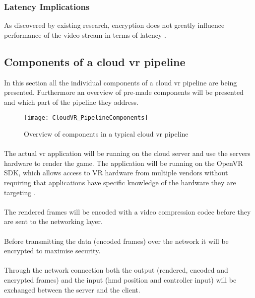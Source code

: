 \subsubsection{Latency Implications}
As discovered by existing research, encryption does not greatly influence performance of the video stream in terms of latency \parencite{Kaknjo_2019}.

\newpage
\subsection{Components of a cloud \acrshort{vr} pipeline}
In this section all the individual components of a cloud \acrshort{vr} pipeline are being presented. Furthermore an overview of pre-made components will be presented and which part of the pipeline they address.

\begin{figure}[h!]
\caption{Overview of components in a typical cloud \acrshort{vr} pipeline}
\label{fig:pipeline}
\texttt{[image: CloudVR\_PipelineComponents]}
\end{figure}


\paragraph{\textSR}
The actual \acrshort{vr} application will be running on the cloud server and use the servers hardware to render the game. The application will be running on the OpenVR SDK, which allows access to VR hardware from multiple vendors without requiring that applications have specific knowledge of the hardware they are targeting \parencite{openvrsdk}. 
\paragraph{\textSECO}
The rendered frames will be encoded with a video compression codec before they are sent to the networking layer.
\paragraph{\textSECR}
Before transmitting the data (encoded frames) over the network it will be encrypted to maximise security.
\paragraph{\textN}
Through the network connection both the output (rendered, encoded and encrypted frames) and the input (\acrshort{hmd} position and controller input) will be exchanged between the server and the client.
